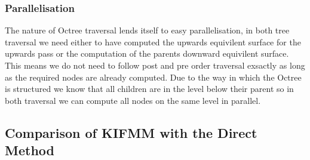 \subsubsection{Parallelisation}
The nature of Octree traversal lends itself to easy parallelisation, in both tree traversal we need either to have computed the upwards equivilent surface for the upwards pass or the computation of the parents downward equivilent surface. This means we do not need to follow post and pre order traversal exsactly as long as the required nodes are already computed. Due to the way in which the Octree is structured we know that all children are in the level below their parent so in both traversal we can compute all nodes on the same level in parallel.

\subsection{Comparison of KIFMM with the Direct Method}
